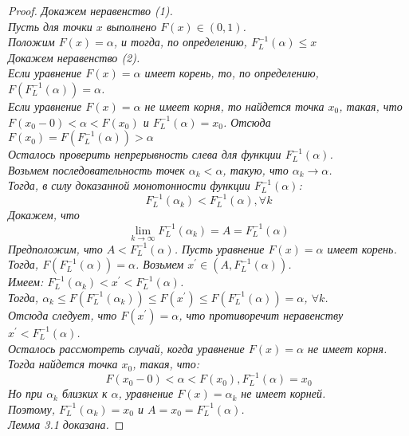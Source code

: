 \documentclass[18pt,a4paper]{article}
\theoremstyle{plain}
\theoremstyle{definition}
\begin{document}
\begin{proof}
\hspace{20pt} \it Докажем неравенство (1).\rm\\
Пусть для точки $x$ выполнено $F(x) \in (0,1)$.\\
Положим $F(x) = \alpha$, и тогда, по определению, $F^{-1}_{L}(\alpha) \le x$\\
\hspace{20pt}\it Докажем неравенство (2).\rm\\
Если уравнение $F(x) = \alpha$ имеет корень, то, по определению, $F(F^{-1}_{L}(\alpha)) = \alpha$.\\
Если уравнение $F(x) = \alpha$ не имеет корня, то найдется точка $x_0$, такая, что $F(x_0-0) < \alpha < F(x_0)$ и $F^{-1}_{L}(\alpha)  = x_0$. Отсюда $F(x_0) = F(F^{-1}_{L}(\alpha)) > \alpha$\\
\hspace{20pt} \it Осталось проверить непрерывность слева для функции $F^{-1}_{L}(\alpha) $.\rm\\
Возьмем последовательность точек $\alpha_k < \alpha$, такую, что $\alpha_k \rightarrow \alpha$.\\
Тогда, в силу доказанной монотонности функции $F^{-1}_{L}(\alpha) $:\\
$$
F^{-1}_{L}(\alpha_k) < F^{-1}_{L}(\alpha), \forall k
$$
Докажем, что
$$
\lim\limits_{k \rightarrow \infty}F^{-1}_{L}(\alpha_k) = A = F^{-1}_{L}(\alpha)
$$
Предположим, что $A < F^{-1}_{L}(\alpha)$. Пусть уравнение $F(x)= \alpha$ имеет корень. Тогда, $F(F^{-1}_{L}(\alpha)) = \alpha$. Возьмем $x^{'} \in (A, F^{-1}_{L}(\alpha))$.\\
Имеем: $F^{-1}_{L}(\alpha_k) < x^{'} < F^{-1}_{L}(\alpha)$.\\
Тогда, $\alpha_k \le F(F^{-1}_{L}(\alpha_k)) \le F(x^{'}) \le F(F^{-1}_{L}(\alpha)) = \alpha$, $\forall k$.\\
Отсюда следует, что $F(x^{'}) = \alpha$, что противоречит неравенству $x^{'} < F^{-1}_{L}(\alpha)$.\\
Осталось рассмотреть случай, когда уравнение $F(x)= \alpha$ не имеет корня.\\
Тогда найдется точка $x_0$, такая, что:\\
$$
F(x_0 -0) < \alpha < F(x_0), F^{-1}_{L}(\alpha)=x_0
$$
Но при $\alpha_k$ близких к $\alpha$, уравнение $F(x)= \alpha_k$ не имеет корней.\\
Поэтому, $F^{-1}_{L}(\alpha_k)=x_0$ и $A = x_0 = F^{-1}_{L}(\alpha)$.\\
Лемма 3.1 доказана.
\end{proof}
\end{document}
